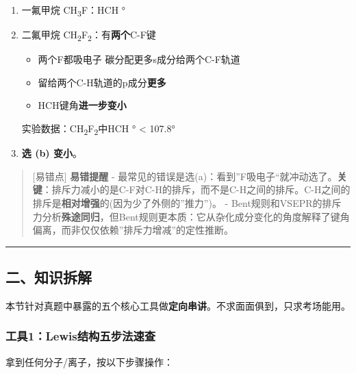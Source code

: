 \begin{enumerate}
\def\labelenumi{\arabic{enumi}.}
\item
  一氟甲烷 CH\textsubscript{3}F：HCH °
\item
  二氟甲烷 CH\textsubscript{2}F\textsubscript{2}：有\textbf{两个}C-F键

  \begin{itemize}
  \tightlist
  \item
    两个F都吸电子 \箭 碳分配更多s成分给两个C-F轨道
  \item
    留给两个C-H轨道的p成分\textbf{更多}
  \item
    HCH键角\textbf{进一步变小}
  \end{itemize}

  实验数据：CH\textsubscript{2}F\textsubscript{2}中HCH ° \textless{} 107.8°
\item
  \textbf{选 (b) 变小}。
\end{enumerate}

\begin{quote}
{[}易错点{]} \textbf{易错提醒}
- 最常见的错误是选(a)：看到''F吸电子``就冲动选了。\textbf{关键}：排斥力减小的是C-F对C-H的排斥，而不是C-H之间的排斥。C-H之间的排斥是\textbf{相对增强}的(因为少了外侧的''推力'')。
- Bent规则和VSEPR的排斥力分析\textbf{殊途同归}，但Bent规则更本质：它从杂化成分变化的角度解释了键角偏离，而非仅仅依赖''排斥力增减''的定性推断。
\end{quote}

\begin{center}\rule{0.5\linewidth}{0.5pt}\end{center}

\subsection{二、知识拆解}\label{ux4e8cux77e5ux8bc6ux62c6ux89e3}

本节针对真题中暴露的五个核心工具做\textbf{定向串讲}。不求面面俱到，只求考场能用。

\subsubsection{工具1：Lewis结构五步法速查}\label{ux5de5ux51771lewisux7ed3ux6784ux4e94ux6b65ux6cd5ux901fux67e5}

拿到任何分子/离子，按以下步骤操作：

